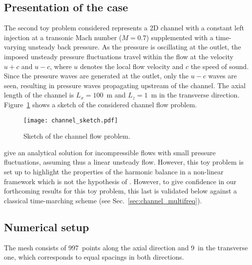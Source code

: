 \subsection{Presentation of the case}
\label{sub:presentation_of_the_case}

The second toy problem considered represents a 2D channel 
with a constant left injection at 
a transonic Mach number ($M=0.7$)
supplemented with a time-varying unsteady back pressure.
As the pressure is oscillating at the outlet, the imposed unsteady pressure
fluctuations travel within the flow at the velocity 
$u + c$ and $u - c$, where $u$ denotes 
the local flow velocity and $c$ the speed of sound.
Since the pressure waves are generated at the outlet, only
the $u-c$ waves are seen, resulting in pressure waves propagating
upstream of the channel. The axial length of the channel is $L_x = 100$~m
and $L_z = 1$~m in the transverse direction.
Figure~\ref{fig:canal_principle} shows a sketch
of the considered channel flow problem.
\begin{figure}[htb]
  \centering
  \texttt{[image: channel\_sketch.pdf]}
  \caption{Sketch of the channel flow problem.}
  \label{fig:canal_principle}
\end{figure}

\citet{Merkle1987} give an analytical solution
for incompressible flows with small pressure fluctuations, assuming
thus a linear unsteady flow.
However, this toy problem is set up to highlight the properties
of the harmonic balance in a non-linear framework which is not
the hypothesis of \citet{Merkle1987}. However, to give confidence
in our forthcoming results for this toy problem,
this last is validated below against a classical time-marching scheme
(see Sec.~\ref{sec:channel_multifreq}).

\subsection{Numerical setup}

The mesh consists of 997~points along the axial direction and 9~in the
transverse one, which corresponds to equal spacings in both
directions. 


